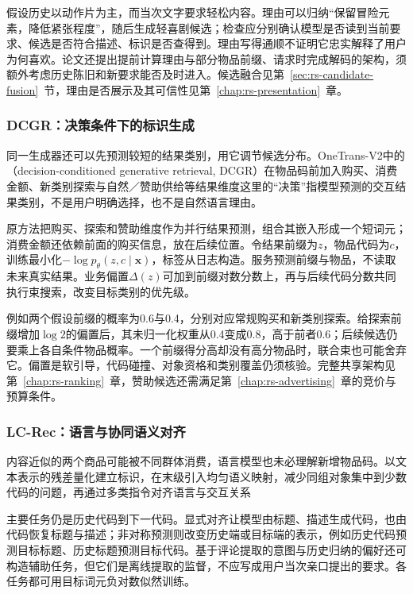 假设历史以动作片为主，而当次文字要求轻松内容。理由可以归纳“保留冒险元素，降低紧张程度”，随后生成轻喜剧候选；检查应分别确认模型是否读到当前要求、候选是否符合描述、标识是否查得到。理由写得通顺不证明它忠实解释了用户为何喜欢。论文还提出提前计算理由与部分物品前缀、请求时完成解码的架构，须额外考虑历史陈旧和新要求能否及时进入。候选融合见第~\ref{sec:rs-candidate-fusion}~节，理由是否展示及其可信性见第~\ref{chap:rs-presentation}~章。

\subsubsection{DCGR：决策条件下的标识生成}
\label{sec:rs-dcgr}

同一生成器还可以先预测较短的结果类别，用它调节候选分布。OneTrans-V2中的（decision-conditioned generative retrieval, DCGR）在物品码前加入购买、消费金额、新类别探索与自然／赞助供给等结果维度这里的“决策”指模型预测的交互结果类别，不是用户明确选择，也不是自然语言理由。

原方法把购买、探索和赞助维度作为并行结果预测，组合其嵌入形成一个短词元；消费金额还依赖前面的购买信息，放在后续位置。令结果前缀为$z$，物品代码为$c$，训练最小化$-\log p_\theta(z,c\mid\bm x)$，标签从日志构造。服务预测前缀与物品，不读取未来真实结果。业务偏置$\Delta(z)$可加到前缀对数分数上，再与后续代码分数共同执行束搜索，改变目标类别的优先级。

例如两个假设前缀的概率为0.6与0.4，分别对应常规购买和新类别探索。给探索前缀增加$\log2$的偏置后，其未归一化权重从0.4变成0.8，高于前者0.6；后续候选仍要乘上各自条件物品概率。一个前缀得分高却没有高分物品时，联合束也可能舍弃它。偏置是软引导，代码碰撞、对象资格和类别覆盖仍须核验。完整共享架构见第~\ref{chap:rs-ranking}~章，赞助候选还需满足第~\ref{chap:rs-advertising}~章的竞价与预算条件。

\Needspace{85mm}
\subsubsection{LC-Rec：语言与协同语义对齐}
\label{sec:rs-lc-rec}

内容近似的两个商品可能被不同群体消费，语言模型也未必理解新增物品码。以文本表示的残差量化建立标识，在末级引入均匀语义映射，减少同组对象集中到少数代码的问题，再通过多类指令对齐语言与交互关系

主要任务仍是历史代码到下一代码。显式对齐让模型由标题、描述生成代码，也由代码恢复标题与描述；非对称预测则改变历史端或目标端的表示，例如历史代码预测目标标题、历史标题预测目标代码。基于评论提取的意图与历史归纳的偏好还可构造辅助任务，但它们是离线提取的监督，不应写成用户当次亲口提出的要求。各任务都可用目标词元负对数似然训练。

